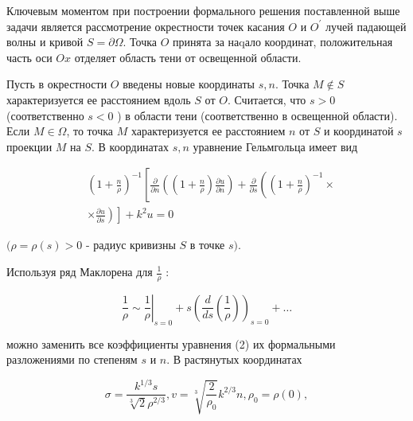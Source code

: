 \documentclass[10pt]{article}
\begin{document}
Ключевым моментом при построении формального решения поставленной выше задачи является рассмотрение окрестности точек касания $O$ и $O^{\prime}$ лучей падающей волны и кривой $S=\partial \Omega$. Точка $O$ принята за наqало координат, положительная часть оси $O x$ отделяет область тени от освещенной области.



Пусть в окрестности $O$ введены новые координаты $s, n$. Точка $M \notin S$ характеризуется ее расстоянием вдоль $S$ от $O$. Считается, что $s>0$ (соответственно $s<0$ ) в области тени (соответственно в освещенной области). Если $M \in \Omega$, то точка $M$ характеризуется ее расстоянием $n$ от $S$ и координатой $s$ проекции $M$ на $S$. В координатах $s, n$ уравнение Гельмгольца имеет вид



\[

\begin{aligned}

& \left(1+\frac{n}{\rho}\right)^{-1}\left[\frac{\partial}{\partial n}\left(\left(1+\frac{n}{\rho}\right) \frac{\partial u}{\partial n}\right)+\frac{\partial}{\partial s}\left(\left(1+\frac{n}{\rho}\right)^{-1} \times\right.\right. \\

& \left.\left.\times \frac{\partial u}{\partial s}\right)\right]+k^{2} u=0

\end{aligned}

\]



$(\rho=\rho(s)>0$ - радиус кривизны $S$ в точке $s)$.



Используя ряд Маклорена для $\frac{1}{\rho}$ :



\[

\left.\frac{1}{\rho} \sim \frac{1}{\rho}\right|_{s=0}+s\left(\frac{d}{d s}\left(\frac{1}{\rho}\right)\right)_{s=0}+\ldots

\]



можно заменить все коэффициенты уравнения (2) их формальными разложениями по степеням $s$ и $n$. В растянутых координатах



\[

\sigma=\frac{k^{1 / 3} s}{\sqrt[3]{2} \rho^{2 / 3}}, v=\sqrt[3]{\frac{2}{\rho_{0}}} k^{2 / 3} n, \rho_{0}=\rho(0),

\]
\end{document}
